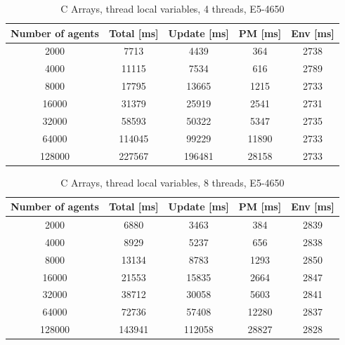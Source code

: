 \documentclass[12pt, a4paper]{report}
\begin{document}
\begin{appendices}
\begin{table}[H]
  \begin{center}
    \begin{tabular}{|c||c||c|c|c|}
    \hline
    Number of agents & Total [ms] & Update [ms] & PM [ms] & Env [ms] \\ \hline
    2000             & 7713       & 4439        & 364     & 2738     \\
    4000             & 11115      & 7534        & 616     & 2789     \\
    8000             & 17795      & 13665       & 1215    & 2733     \\
    16000            & 31379      & 25919       & 2541    & 2731     \\
    32000            & 58593      & 50322       & 5347    & 2735     \\
    64000            & 114045     & 99229       & 11890   & 2733     \\
    128000           & 227567     & 196481      & 28158   & 2733     \\ \hline
    \end{tabular}
    \caption {C Arrays, thread local variables, 4 threads, E5-4650}
    \label{table:append-c-arrays-4-thread-potoo}
  \end{center}
\end{table}

\begin{table}[H]
  \begin{center}
    \begin{tabular}{|c||c||c|c|c|}
    \hline
    Number of agents & Total [ms] & Update [ms] & PM [ms] & Env [ms] \\ \hline
    2000             & 6880       & 3463        & 384     & 2839     \\
    4000             & 8929       & 5237        & 656     & 2838     \\
    8000             & 13134      & 8783        & 1293    & 2850     \\
    16000            & 21553      & 15835       & 2664    & 2847     \\
    32000            & 38712      & 30058       & 5603    & 2841     \\
    64000            & 72736      & 57408       & 12280   & 2837     \\
    128000           & 143941     & 112058      & 28827   & 2828     \\ \hline
    \end{tabular}
    \caption {C Arrays, thread local variables, 8 threads, E5-4650}
    \label{table:append-c-arrays-8-thread-potoo}
  \end{center}
\end{table}


\end{appendices}
\end{document}
